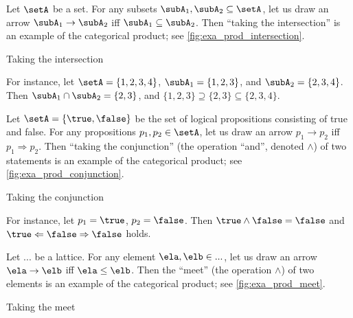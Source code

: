 \begin{example}\label{exa:intersection-as-prod}
Let $\setA$ be a set. For any subsets $\subA_1, \subA_2 \subseteq \setA$, let us draw an arrow $\subA_1 \to \subA_2$ iff $\subA_1 \subseteq \subA_2$.  Then ``taking the intersection'' is an example of the categorical product; see \cref{fig:exa_prod_intersection}. 
  \begin{marginfigure}
  \begin{center}
  \end{center}
    \caption{Taking the intersection}
    \label{fig:exa_prod_intersection}
  \end{marginfigure}
 For instance, let $\setA = \{ 1, 2, 3, 4 \}$, $\subA_1 = \{ 1, 2, 3 \}$, and $\subA_2 = \{2, 3, 4 \}$. Then $\subA_1 \cap \subA_2 = \{2, 3 \}$, and $\{ 1, 2, 3 \} \supseteq \{2, 3 \} \subseteq \{2, 3, 4 \}$. 
\end{example}


\begin{example}\label{exa:conjunction-as-prod}
Let $\setA = \{ \true, \false \}$ be the set of logical propositions consisting of true and false. For any propositions $p_1, p_2  \in \setA$, let us draw an arrow $p_1 \to p_2$ iff $p_1 \Rightarrow p_2$. Then ``taking the conjunction'' (the operation ``and'', denoted $\wedge$) of two statements is an example of the categorical product; see \cref{fig:exa_prod_conjunction}. 
  \begin{marginfigure}
  \begin{center}
  \end{center}
    \caption{Taking the conjunction}
    \label{fig:exa_prod_conjunction}
  \end{marginfigure}
 For instance, let $p_1 = \true$, $p_2 = \false$. Then $\true \wedge \false = \false$ and $\true \Leftarrow \false \Rightarrow \false$ holds. 
\end{example}

\begin{example}\label{exa:meet-as-prod}
Let $...$ be a lattice. For any element $\ela, \elb \in ...$, let us draw an arrow $\ela \to \elb$ iff $\ela \leq \elb$. Then the ``meet'' (the operation $\wedge$) of two elements is an example of the categorical product; see \cref{fig:exa_prod_meet}. 
  \begin{marginfigure}
  \begin{center}
  \end{center}
    \caption{Taking the meet}
    \label{fig:exa_prod_meet}
  \end{marginfigure}
\end{example}

